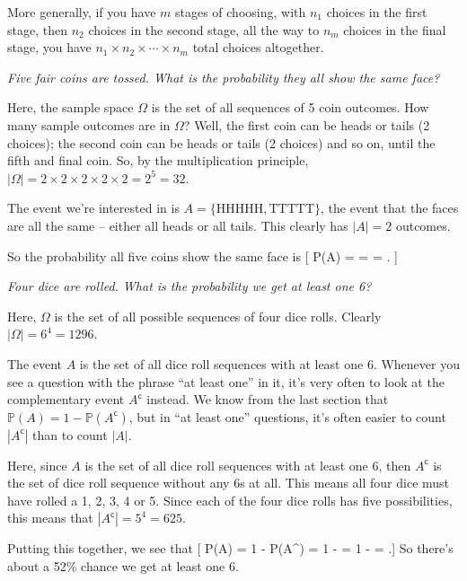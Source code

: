 \documentclass[
  letterpaper,
]{report}
\theoremstyle{definition}
\theoremstyle{definition}
\theoremstyle{remark}
\begin{document}
More generally, if you have \(m\) stages of choosing, with \(n_1\)
choices in the first stage, then \(n_2\) choices in the second stage,
all the way to \(n_m\) choices in the final stage, you have
\(n_1 \times n_2 \times \cdots \times n_m\) total choices altogether.

\emph{Five fair coins are tossed. What is the probability they all show
the same face?}

Here, the sample space \(\Omega\) is the set of all sequences of 5 coin
outcomes. How many sample outcomes are in \(\Omega\)? Well, the first
coin can be heads or tails (2 choices); the second coin can be heads or
tails (2 choices) and so on, until the fifth and final coin. So, by the
multiplication principle,
\(|\Omega| = 2 \times 2 \times 2 \times 2 \times 2 = 2^5 = 32\).

The event we're interested in is \(A = \{\text{HHHHH}, \text{TTTTT}\}\),
the event that the faces are all the same -- either all heads or all
tails. This clearly has \(|A| = 2\) outcomes.

So the probability all five coins show the same face is {[} \mathbb P(A)
=  =  =  . {]}

\emph{Four dice are rolled. What is the probability we get at least one
6?}

Here, \(\Omega\) is the set of all possible sequences of four dice
rolls. Clearly \(|\Omega| = 6^4 = 1296\).

The event \(A\) is the set of all dice roll sequences with at least one
6. Whenever you see a question with the phrase ``at least one'' in it,
it's very often to look at the complementary event \(A^\mathsf{c}\)
instead. We know from the last section that
\(\mathbb P(A) = 1 - \mathbb P(A^\mathsf{c})\), but in ``at least one''
questions, it's often easier to count \(|A^\mathsf{c}|\) than to count
\(|A|\).

Here, since \(A\) is the set of all dice roll sequences with at least
one 6, then \(A^\mathsf{c}\) is the set of dice roll sequence without
any 6s at all. This means all four dice must have rolled a 1, 2, 3, 4 or
5. Since each of the four dice rolls has five possibilities, this means
that \(|A^\mathsf{c}| = 5^4 = 625\).

Putting this together, we see that {[} \mathbb P(A) = 1 -
\mathbb P(A\^{}) = 1 -  = 1 -
 =   .{]} So there's about
a 52\% chance we get at least one 6.
\end{document}
